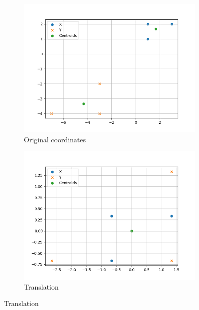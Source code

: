 \begin{figure}[h]
    \centering
    \begin{subfigure}[b]{0.475\textwidth}
        \centering
        \includegraphics[width=\textwidth]{figures/procrustes/procrustes_ex1}
        \caption[]
        {{\small Original coordinates}}    
        \label{fig:procrustes_ex_1}
    \end{subfigure}
    \begin{subfigure}[b]{0.475\textwidth}  
        \centering 
        \includegraphics[width=\textwidth]{figures/procrustes/procrustes_ex2}
        \caption[]
        {{\small Translation}}    
        \label{fig:procrustes_ex_2}
    \end{subfigure}

\end{figure}
